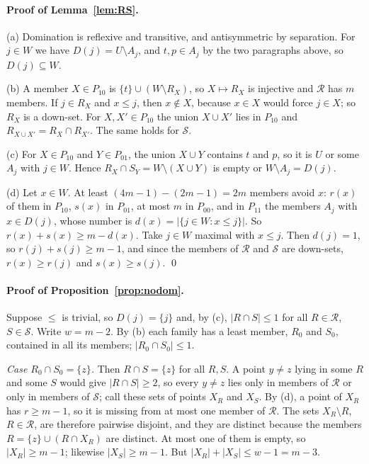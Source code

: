 \documentclass[aps,prd,twocolumn,superscriptaddress,nofootinbib,longbibliography,floatfix,amsmath,amssymb,10pt]{revtex4-2}
\theoremstyle{plain}
\theoremstyle{definition}
\theoremstyle{plain}
\begin{document}
\paragraph*{Proof of Lemma~\ref{lem:RS}.} (a) Domination is reflexive and transitive, and antisymmetric by separation. For $j\in W$ we have $D(j)=U\setminus A_j$, and $t,p\in A_j$ by the two paragraphs above, so $D(j)\subseteq W$.

(b) A member $X\in P_{10}$ is $\{t\}\cup(W\setminus R_X)$, so $X\mapsto R_X$ is injective and $\mathcal R$ has $m$ members. If $j\in R_X$ and $x\le j$, then $x\notin X$, because $x\in X$ would force $j\in X$; so $R_X$ is a down-set. For $X,X'\in P_{10}$ the union $X\cup X'$ lies in $P_{10}$ and $R_{X\cup X'}=R_X\cap R_{X'}$. The same holds for $\mathcal S$.

(c) For $X\in P_{10}$ and $Y\in P_{01}$, the union $X\cup Y$ contains $t$ and $p$, so it is $U$ or some $A_j$ with $j\in W$. Hence $R_X\cap S_Y=W\setminus(X\cup Y)$ is empty or $W\setminus A_j=D(j)$.

(d) Let $x\in W$. At least $(4m-1)-(2m-1)=2m$ members avoid $x$: $r(x)$ of them in $P_{10}$, $s(x)$ in $P_{01}$, at most $m$ in $P_{00}$, and in $P_{11}$ the members $A_j$ with $x\in D(j)$, whose number is $d(x)=|\{j\in W:x\le j\}|$. So $r(x)+s(x)\ge m-d(x)$. Take $j\in W$ maximal with $x\le j$. Then $d(j)=1$, so $r(j)+s(j)\ge m-1$, and since the members of $\mathcal R$ and $\mathcal S$ are down-sets, $r(x)\ge r(j)$ and $s(x)\ge s(j)$. \qed

\paragraph*{Proof of Proposition~\ref{prop:nodom}.} Suppose $\le$ is trivial, so $D(j)=\{j\}$ and, by (c), $|R\cap S|\le1$ for all $R\in\mathcal R$, $S\in\mathcal S$. Write $w=m-2$. By (b) each family has a least member, $R_0$ and $S_0$, contained in all its members; $|R_0\cap S_0|\le 1$.

\emph{Case $R_0\cap S_0=\{z\}$.} Then $R\cap S=\{z\}$ for all $R,S$. A point $y\ne z$ lying in some $R$ and some $S$ would give $|R\cap S|\ge2$, so every $y\neq z$ lies only in members of $\mathcal R$ or only in members of $\mathcal S$; call these sets of points $X_R$ and $X_S$. By (d), a point of $X_R$ has $r\ge m-1$, so it is missing from at most one member of $\mathcal R$. The sets $X_R\setminus R$, $R\in\mathcal R$, are therefore pairwise disjoint, and they are distinct because the members $R=\{z\}\cup(R\cap X_R)$ are distinct. At most one of them is empty, so $|X_R|\ge m-1$; likewise $|X_S|\ge m-1$. But $|X_R|+|X_S|\le w-1=m-3$.
\end{document}
